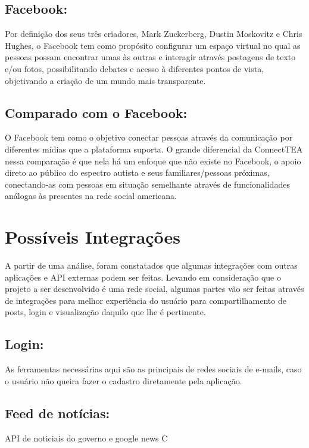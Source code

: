 \begin{apendicesenv}
	
	\subsection{Facebook:}
	Por definição dos seus três criadores, Mark Zuckerberg, Dustin Moskovitz e Chris Hughes, o Facebook tem como propósito configurar um espaço virtual no qual as pessoas possam encontrar umas às outras e interagir através postagens de texto e/ou fotos, possibilitando debates e acesso à diferentes pontos de vista, objetivando a criação de um mundo mais transparente.
	
	\subsection{Comparado com o Facebook:}
	O Facebook tem como o objetivo conectar pessoas através da comunicação por diferentes mídias que a plataforma suporta. O grande diferencial da ConnectTEA nessa comparação é que nela há um enfoque que não existe no Facebook, o apoio direto ao público do espectro autista e seus familiares/pessoas próximas, conectando-as com pessoas em situação semelhante através de funcionalidades análogas às presentes na rede social americana.
	
	
	
	
	
	\section{Possíveis Integrações}
	A partir de uma análise, foram constatados que algumas integrações com outras aplicações e API externas podem ser feitas. Levando em consideração que o projeto a ser desenvolvido é uma rede social, algumas partes vão ser feitas através de integrações para melhor experiência do usuário para compartilhamento de posts, login e visualização daquilo que lhe é pertinente. 
	
	\subsection{Login:}
	As ferramentas necessárias aqui são as principais de redes sociais de e-mails, caso o usuário não queira fazer o cadastro diretamente pela aplicação. 
	\subsection{Feed de notícias:}
	API de noticiais do governo e google news C

\end{apendicesenv}
